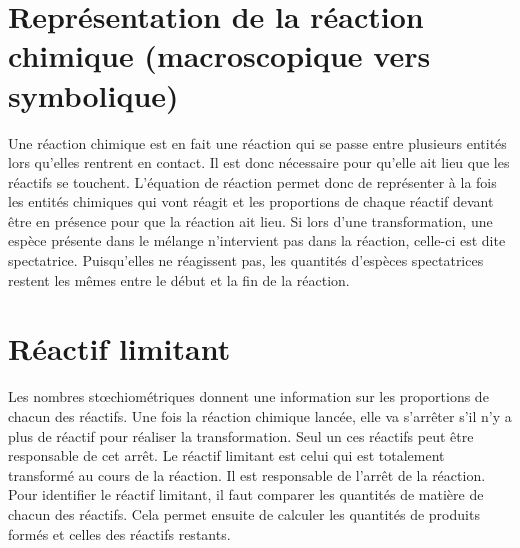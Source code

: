 \documentclass[a4paper,11pt,fleqn]{article}%
\begin{document}
\section{Représentation de la réaction chimique (macroscopique vers symbolique)}
Une réaction chimique est en fait une réaction qui se passe entre plusieurs entités lors qu’elles rentrent en contact. Il est donc nécessaire pour qu’elle ait lieu que les réactifs se touchent. L’équation de réaction permet donc de représenter à la fois les entités chimiques qui vont réagit et les proportions de chaque réactif devant être en présence pour que la réaction ait lieu. Si lors d’une transformation, une espèce présente dans le mélange n’intervient pas dans la réaction, celle-ci est dite spectatrice. Puisqu’elles ne réagissent pas, les quantités d’espèces spectatrices restent les mêmes entre le début et la fin de la réaction.
\section{Réactif limitant}
Les nombres stœchiométriques donnent une information sur les proportions de chacun des réactifs. Une fois la réaction chimique lancée, elle va s’arrêter s’il n’y a plus de réactif pour réaliser la transformation. Seul un ces réactifs peut être responsable de cet arrêt.
Le réactif limitant est celui qui est totalement transformé au cours de la réaction. Il est responsable de l’arrêt de la réaction.\\
Pour identifier le réactif limitant, il faut comparer les quantités de matière de chacun des réactifs. Cela permet ensuite de calculer les quantités de produits formés et celles des réactifs restants.
\end{document}

